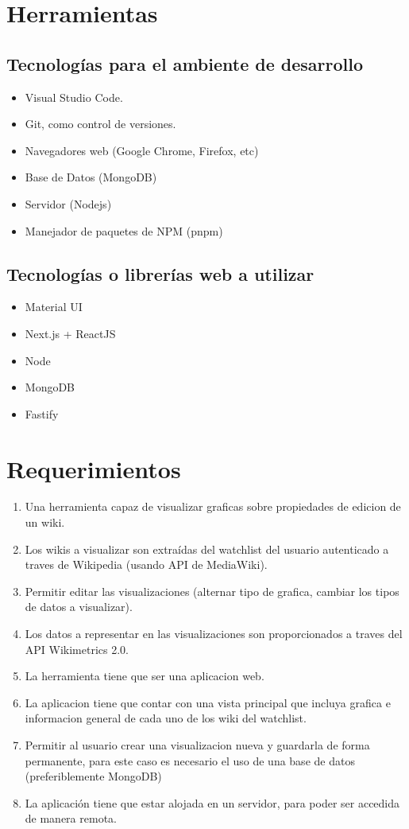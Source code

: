\section{Herramientas}

\subsection{Tecnologías para el ambiente de desarrollo}
\begin{itemize}
    \item Visual Studio Code.
    \item Git, como control de versiones.
    \item Navegadores web (Google Chrome, Firefox, etc)
    \item Base de Datos (MongoDB)
    \item Servidor (Nodejs)
    \item Manejador de paquetes de NPM (pnpm)
\end{itemize}

\subsection{Tecnologías o librerías web a utilizar}
\begin{itemize}
    \item Material UI
    \item Next.js + ReactJS
    \item Node
    \item MongoDB
    \item Fastify
\end{itemize}

\section{Requerimientos}
\begin{enumerate}
    \item{Una herramienta capaz de visualizar graficas sobre propiedades de edicion de un wiki.}
    \item{Los wikis a visualizar son extraídas del watchlist del usuario autenticado a traves de Wikipedia (usando API de MediaWiki).}
    \item{Permitir editar las visualizaciones (alternar tipo de grafica, cambiar los tipos de datos a visualizar).}
    \item{Los datos a representar en las visualizaciones son proporcionados a traves del API Wikimetrics 2.0.}
    \item{La herramienta tiene que ser una aplicacion web.}
    \item{La aplicacion tiene que contar con una vista principal que incluya grafica e informacion general de cada uno de los wiki del watchlist.}
    \item{Permitir al usuario crear una visualizacion nueva y guardarla de forma permanente, para este caso es necesario el uso de una base de datos (preferiblemente MongoDB)}
    \item{La aplicación tiene que estar alojada en un servidor, para poder ser accedida de manera remota.}
\end{enumerate}


